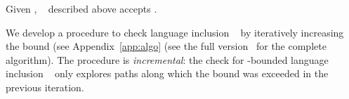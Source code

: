 \begin{proposition}
Given , \nfa~ described above accepts .
\end{proposition}


We develop a procedure to check 
language inclusion \upto~ by iteratively increasing the bound 
\ifappendix
(see Appendix~\ref{app:algo}
\else
(see the full version~\cite{fullversion}
\fi
for the complete algorithm). 
The procedure is {\em incremental}: the check for -bounded language
inclusion \upto~ only explores paths along which the bound 
was exceeded in the previous iteration. 






